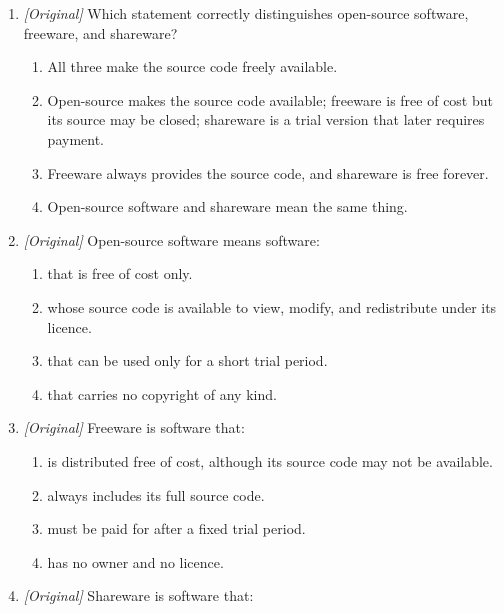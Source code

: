 \begin{enumerate}[label=\textbf{Q\arabic*.}, leftmargin=*]
  software?
  \begin{enumerate}[label=\Alph*.]
    \item Operating system
    \item Device driver
    \item MS Word
    \item BIOS
  \end{enumerate}
\item \textit{[Original]} Which statement correctly distinguishes open-source
  software, freeware, and shareware?
  \begin{enumerate}[label=\Alph*.]
    \item All three make the source code freely available.
    \item Open-source makes the source code available; freeware is free of
      cost but its source may be closed; shareware is a trial version that
      later requires payment.
    \item Freeware always provides the source code, and shareware is free
      forever.
    \item Open-source software and shareware mean the same thing.
  \end{enumerate}
\item \textit{[Original]} Open-source software means software:
  \begin{enumerate}[label=\Alph*.]
    \item that is free of cost only.
    \item whose source code is available to view, modify, and redistribute
      under its licence.
    \item that can be used only for a short trial period.
    \item that carries no copyright of any kind.
  \end{enumerate}
\item \textit{[Original]} Freeware is software that:
  \begin{enumerate}[label=\Alph*.]
    \item is distributed free of cost, although its source code may not be
      available.
    \item always includes its full source code.
    \item must be paid for after a fixed trial period.
    \item has no owner and no licence.
  \end{enumerate}
\item \textit{[Original]} Shareware is software that:
  \begin{enumerate}[label=\Alph*.]

\end{enumerate}
\end{enumerate}
